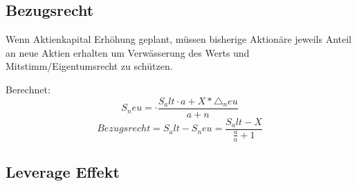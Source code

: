 \subsection{Bezugsrecht}

Wenn Aktienkapital Erhöhung geplant, müssen bisherige Aktionäre jeweils Anteil an neue Aktien erhalten um Verwässerung des Werts und Mitstimm/Eigentumsrecht zu schützen.

Berechnet:
\begin{equation}
    S_neu = \cdot \frac{S_alt \cdot a + X * \triangle_neu}{a + n} 
\end{equation}
\begin{equation}
    Bezugsrecht = S_alt - S_neu = \frac{S_alt- X}{\frac{a}{n} + 1}
\end{equation}

\subsection{Leverage Effekt}


